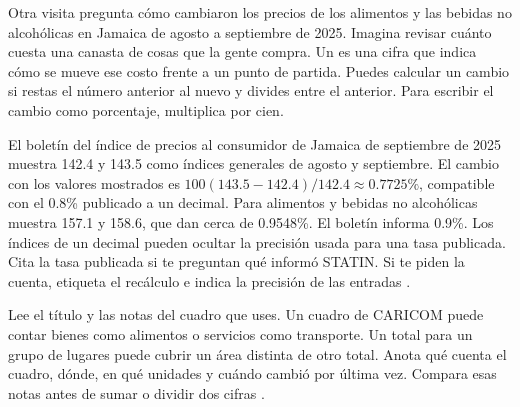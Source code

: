 {Otra visita pregunta cómo cambiaron los precios de los alimentos y las bebidas no alcohólicas en Jamaica de agosto a septiembre de 2025. Imagina revisar cuánto cuesta una canasta de cosas que la gente compra. Un  es una cifra que indica cómo se mueve ese costo frente a un punto de partida. Puedes calcular un cambio si restas el número anterior al nuevo y divides entre el anterior. Para escribir el cambio como porcentaje, multiplica por cien.}

{El boletín del índice de precios al consumidor de Jamaica de septiembre de 2025 muestra 142.4 y 143.5 como índices generales de agosto y septiembre. El cambio con los valores mostrados es \(100(143.5-142.4)/142.4\approx0.7725\%\), compatible con el 0.8\% publicado a un decimal. Para alimentos y bebidas no alcohólicas muestra 157.1 y 158.6, que dan cerca de 0.9548\%. El boletín informa 0.9\%. Los índices de un decimal pueden ocultar la precisión usada para una tasa publicada. Cita la tasa publicada si te preguntan qué informó STATIN. Si te piden la cuenta, etiqueta el recálculo e indica la precisión de las entradas \citep{statin}.}

{Lee el título y las notas del cuadro que uses. Un cuadro de CARICOM puede contar bienes como alimentos o servicios como transporte. Un total para un grupo de lugares puede cubrir un área distinta de otro total. Anota qué cuenta el cuadro, dónde, en qué unidades y cuándo cambió por última vez. Compara esas notas antes de sumar o dividir dos cifras \citep{caristats}.}

